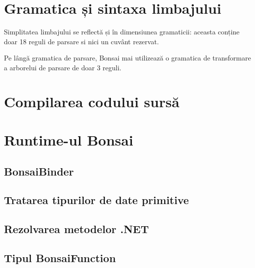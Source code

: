 \documentclass[12pt,a4paper]{memoir}
\begin{document}
\chapter{Gramatica și sintaxa limbajului}

Simplitatea limbajului se reflectă și în dimensiunea gramaticii: aceasta conține doar 18 reguli de parsare si nici un cuvânt rezervat.


Pe lângă gramatica de parsare, Bonsai mai utilizează o gramatica de transformare a arborelui de parsare de doar 3 reguli.


\chapter{Compilarea codului sursă}




\chapter{Runtime-ul Bonsai}

\section{BonsaiBinder}

\section{Tratarea tipurilor de date primitive}

\section{Rezolvarea metodelor .NET}

\section{Tipul BonsaiFunction}
\end{document}
